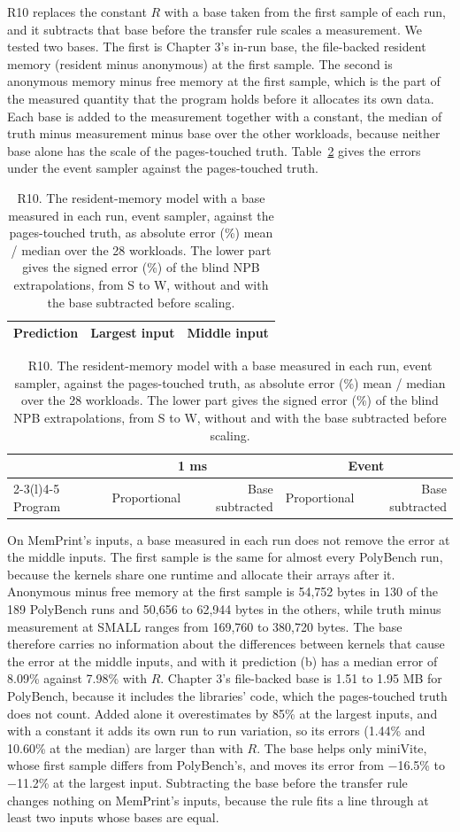 \documentclass[11pt]{article}
\newcommand{\tabinput}[1]{}
\newcommand{\memprint}{MemPrint}
\begin{document}
R10 replaces the constant $R$ with a base taken from the first sample of each run, and it subtracts that base
before the transfer rule scales a measurement. We tested two bases. The first is Chapter 3's in-run base, the
file-backed resident memory (resident minus anonymous) at the first sample. The second is anonymous memory minus
free memory at the first sample, which is the part of the measured quantity that the program holds before it
allocates its own data. Each base is added to the measurement together with a constant, the median of truth minus
measurement minus base over the other workloads, because neither base alone has the scale of the pages-touched
truth. Table~\ref{tab:r10} gives the errors under the event sampler against the pages-touched truth.

\begin{table}[htbp]
\centering
\caption{R10. The resident-memory model with a base measured in each run, event sampler, against the
pages-touched truth, as absolute error (\%) mean / median over the 28 workloads. The lower part gives the signed
error (\%) of the blind NPB extrapolations, from S to W, without and with the base subtracted before scaling.}
\label{tab:r10}
\small
\begin{tabular}{@{}lrr@{}}
\toprule
Prediction & Largest input & Middle input \\
\midrule
\tabinput{r10}
\bottomrule
\end{tabular}

\medskip
\begin{tabular}{@{}lrrrr@{}}
\toprule
& \multicolumn{2}{c}{1 ms} & \multicolumn{2}{c}{Event} \\
\cmidrule(lr){2-3}\cmidrule(l){4-5}
Program & Proportional & Base subtracted & Proportional & Base subtracted \\
\midrule
\tabinput{r10blind}
\bottomrule
\end{tabular}
\end{table}

On \memprint{}'s inputs, a base measured in each run does not remove the error at the middle inputs. The first
sample is the same for almost every PolyBench run, because the kernels share one runtime and allocate their arrays
after it. Anonymous minus free memory at the first sample is 54,752 bytes in 130 of the 189 PolyBench runs and 50,656
to 62,944 bytes in the others, while truth minus measurement at SMALL ranges from 169,760 to 380,720 bytes. The
base therefore carries no information about the differences between kernels that cause the error at the middle
inputs, and with it prediction (b) has a median error of 8.09\% against 7.98\% with $R$. Chapter 3's file-backed
base is 1.51 to 1.95 MB for PolyBench, because it includes the libraries' code, which the pages-touched truth does
not count. Added alone it overestimates by 85\% at the largest inputs, and with a constant it adds its own run to
run variation, so its errors (1.44\% and 10.60\% at the median) are larger than with $R$. The base helps only
miniVite, whose first sample differs from PolyBench's, and moves its error from $-$16.5\% to $-$11.2\% at the
largest input. Subtracting the base before the transfer rule changes nothing on \memprint{}'s inputs, because the
rule fits a line through at least two inputs whose bases are equal.
\end{document}
